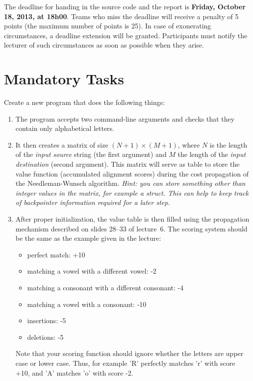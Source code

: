 \documentclass[a4paper,10pt]{article}
\begin{document}
The deadline for handing in the source code and the report is \textbf{Friday, October 18, 2013, at 18h00}.
Teams who miss the deadline will receive a penalty of 5 points (the maximum number of points is 25).
In case of exonerating circumstances, a deadline extension will be granted.
Participants must notify the lecturer of such circumstances as soon as possible when they arise.



\section{Mandatory Tasks}

Create a new program that does the following things:

\begin{enumerate}
\item
  The program accepts two command-line arguments and checks that they contain only alphabetical letters.
\item
  It then creates a matrix of size $(N+1)\times(M+1)$, where $N$ is the length of the \emph{input source} string (the first argument) and $M$ the length of the \emph{input destination} (second argument).
  This matrix will serve as table to store the value function (accumulated alignment scores) during the cost propagation of the Needleman-Wunsch algorithm.
  \emph{
    Hint: you can store something other than integer values in the matrix, for example a struct.
    This can help to keep track of backpointer information required for a later step.
  }
\item
  After proper initialization, the value table is then filled using the propagation mechanism described on slides 28--33 of lecture~6.
  The scoring system should be the same as the example given in the lecture:
  \begin{itemize}
  \item
    perfect match: +10
  \item
    matching a vowel with a different vowel: -2
  \item
    matching a consonant with a different consonant: -4
  \item
    matching a vowel with a consonant: -10
  \item
    insertions: -5
  \item
    deletions: -5
  \end{itemize}
  Note that your scoring function should ignore whether the letters are upper case or lower case.
  Thus, for example 'R' perfectly matches 'r' with score +10, and 'A' matches 'o' with score -2.

\end{enumerate}
\end{document}
